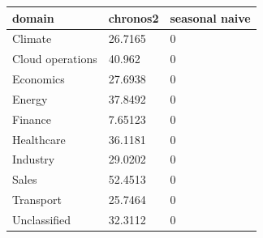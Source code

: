 \begin{tabular}{lll}
\toprule
domain & chronos2 & seasonal naive \\
\midrule
Climate & 26.7165 & 0 \\
Cloud operations & 40.962 & 0 \\
Economics & 27.6938 & 0 \\
Energy & 37.8492 & 0 \\
Finance & 7.65123 & 0 \\
Healthcare & 36.1181 & 0 \\
Industry & 29.0202 & 0 \\
Sales & 52.4513 & 0 \\
Transport & 25.7464 & 0 \\
Unclassified & 32.3112 & 0 \\
\bottomrule
\end{tabular}
